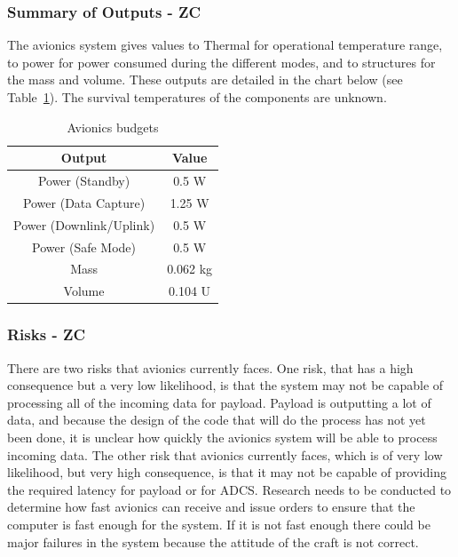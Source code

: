 \documentclass[12pt]{article}
\begin{document}
			\subsubsection{Summary of Outputs - ZC}

The avionics system gives values to Thermal for operational temperature range, to power for power consumed during the different modes, and to structures for the mass and volume. These outputs are detailed in the chart below (see Table~\ref{table:avionics_summary_outputs}). The survival temperatures of the components are unknown.


\begin{table}[ht]
\caption{Avionics budgets}
\label{table:avionics_summary_outputs}
\begin{center}
    \begin{tabular}{|c||c|} \hline
    	Output & Value \\ \hline \hline
    Power (Standby) & 0.5 W  \\
    Power (Data Capture) & 1.25 W \\
    Power (Downlink/Uplink) & 0.5 W \\
    Power (Safe Mode) & 0.5 W \\
    Mass & 0.062 kg  \\
    Volume & 0.104 U \\ \hline 
    \end{tabular}
\end{center}
\end{table}

			\subsubsection{Risks - ZC}
There are two risks that avionics currently faces. One risk, that has a high consequence but a very low likelihood, is that the system may not be capable of processing all of the incoming data for payload. Payload is outputting a lot of data, and because the design of the code that will do the process has not yet been done, it is unclear how quickly the avionics system will be able to process incoming data. The other risk that avionics currently faces, which is of very low likelihood, but very high consequence, is that it may not be capable of providing the required latency for payload or for ADCS. Research needs to be conducted to determine how fast avionics can receive and issue orders to ensure that the computer is fast enough for the system. If it is not fast enough there could be major failures in the system because the attitude of the craft is not correct.
\end{document}
